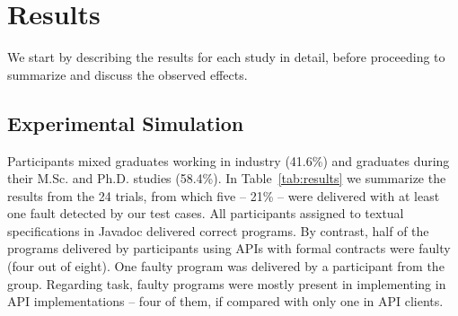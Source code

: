 \section{Results}
\label{results}

We start by describing the results for each study in detail, before proceeding to summarize and discuss the observed effects.

\subsection{Experimental Simulation}
\label{sec:expResults}

Participants mixed graduates working in industry (41.6\%) and graduates during their M.Sc. and Ph.D. studies (58.4\%).
In Table~\ref{tab:results} we summarize the results from the 24 trials, from which five -- 21\% -- were delivered with at least one fault detected by our test cases.
All participants assigned to textual specifications in Javadoc delivered correct programs.
By contrast, half of the programs delivered by participants using APIs with formal contracts were faulty (four out of eight).
One faulty program was delivered by a participant from the \contractjdoc{} group.
Regarding task, faulty programs were mostly present in implementing in API implementations -- four of them, if compared with only one in API clients.





